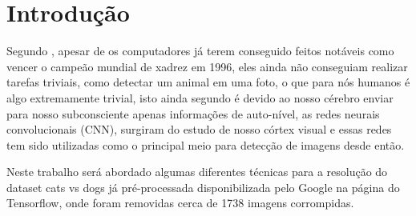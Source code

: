 \section{Introdução}

Segundo , apesar de os computadores já terem conseguido feitos notáveis como vencer o campeão mundial de xadrez em 1996, eles ainda não conseguiam realizar tarefas triviais, como detectar um animal em uma foto, o que para nós humanos é algo extremamente trivial, isto ainda segundo  é devido ao nosso cérebro enviar para nosso subconsciente apenas informações de auto-nível, as redes neurais convolucionais (CNN), surgiram do estudo de nosso córtex visual e essas redes tem sido utilizadas como o principal meio para detecção de imagens desde então.

Neste trabalho será abordado algumas diferentes técnicas para a resolução do dataset cats vs dogs já pré-processada disponibilizada pelo Google na página do Tensorflow, onde foram removidas cerca de 1738 imagens corrompidas. 
